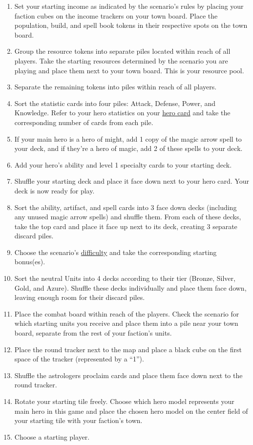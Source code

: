 \documentclass[12pt]{article}
\begin{document}
\begin{enumerate}
\item Set your starting income as indicated by the scenario’s rules by placing your faction cubes on the income trackers on your town board. Place the population, build, and spell book tokens in their respective spots on the town board.
\item Group the resource tokens into separate piles located within reach of all players. Take the starting resources determined by the scenario you are playing and place them next to your town board. This is your resource pool.
\item Separate the remaining tokens into piles within reach of all players.
\item Sort the statistic cards into four piles: Attack, Defense, Power, and Knowledge. Refer to your hero statistics on your \hyperlink{Herocard}{hero card} and take the corresponding number of cards from each pile.
\item If your main hero is a hero of might, add 1 copy of the magic arrow spell to your deck, and if they’re a hero of magic, add 2 of these spells to your deck.
\item Add your hero’s ability and level 1 specialty cards to your starting deck.
\item Shuffle your starting deck and place it face down next to your hero card. Your deck is now ready for play.
\item Sort the ability, artifact, and spell cards into 3 face down decks (including any unused magic arrow spells) and shuffle them. From each of these decks, take the top card and place it face up next to its deck, creating 3 separate discard piles.
\item Choose the scenario’s \hyperlink{Difficulty}{difficulty} and take the corresponding starting bonus(es).
\item Sort the neutral Units into 4 decks according to their tier (Bronze, Silver, Gold, and Azure). Shuffle these decks individually and place them face down, leaving enough room for their discard piles.
\item Place the combat board within reach of the players. Check the scenario for which starting units you receive and place them into a pile near your town board, separate from the rest of your faction’s units.
\item Place the round tracker next to the map and place a black cube on the first space of the tracker (represented by a “1”).
\item Shuffle the astrologers proclaim cards and place them face down next to the round tracker.
\item Rotate your starting tile freely. Choose which hero model represents your main hero in this game and place the chosen hero model on the center field of your starting tile with your faction’s town.
\item Choose a starting player.

\end{enumerate}
\end{document}
